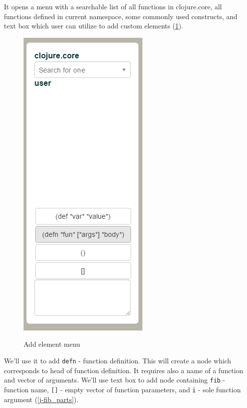\documentclass[11pt]{scrartcl}
\begin{document}
It opens a menu with a searchable list of all functions in clojure.core, all
functions defined in current namespace, some commonly used constructs, and text
box which user can utilize to add custom elements (\ref{j-add_box}).

\begin{figure}[hbt]
  \includegraphics[scale=0.3]{img/j-add_box}
  \label{j-add_box}
  \caption{Add element menu}
\end{figure}

We'll use it to add \lstinline|defn| - function definition. This will create a
node which corresponds to head of function definition. It requires also a name of
a function and vector of arguments. We'll use text box to add node containing
\lstinline|fib| - function name, \lstinline|[]| - empty vector of function
parameters, and \lstinline|i| - sole function argument (\ref{j-fib_parts}).
\end{document}
